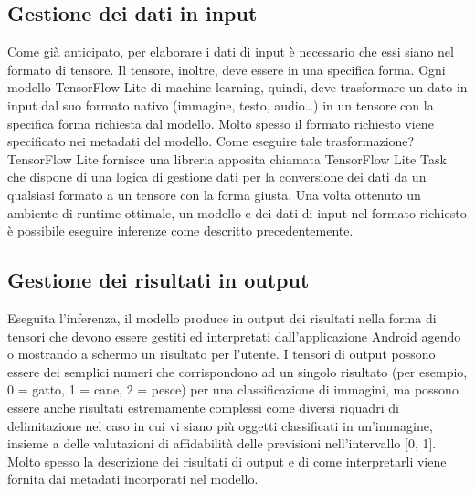 \newpage
\subsection{Gestione dei dati in input}
Come già anticipato, per elaborare i dati di input è necessario che essi siano nel formato di tensore. Il tensore, inoltre, deve essere in una specifica forma. Ogni modello TensorFlow Lite di machine learning, quindi, deve trasformare
un dato in input dal suo formato nativo (immagine, testo, audio…) in un tensore con la specifica forma richiesta dal modello. Molto spesso il formato richiesto viene specificato nei metadati del modello. Come eseguire tale trasformazione?
TensorFlow Lite fornisce una libreria apposita chiamata TensorFlow Lite Task che dispone di una logica di gestione dati per la conversione dei dati da un qualsiasi formato a un tensore con la forma giusta.
Una volta ottenuto un ambiente di runtime ottimale, un modello e dei dati di input nel formato richiesto è possibile eseguire inferenze come descritto precedentemente.

\subsection{Gestione dei risultati in output}
Eseguita l’inferenza, il modello produce in output dei risultati nella forma di tensori che devono essere gestiti ed interpretati dall’applicazione Android agendo o mostrando a schermo un risultato per l’utente. 
I tensori di output possono essere dei semplici numeri che corrispondono ad un singolo risultato (per esempio, 0 = gatto, 1 = cane, 2 = pesce) per una classificazione di immagini, ma possono essere anche risultati estremamente
complessi come diversi riquadri di delimitazione nel caso in cui vi siano più oggetti classificati in un’immagine, insieme a delle valutazioni di affidabilità delle previsioni nell’intervallo [0, 1].
Molto spesso la descrizione dei risultati di output e di come interpretarli viene fornita dai metadati incorporati nel modello.

